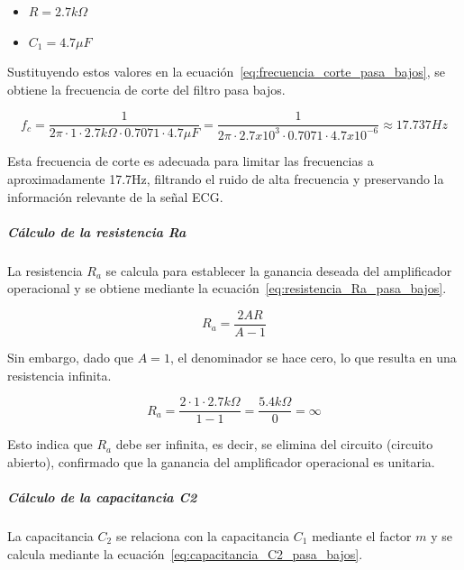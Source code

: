                     \begin{itemize}
                        \item $R = 2.7 k\Omega$
                        \item $C_1 = 4.7 \mu F$
                    \end{itemize}

                    Sustituyendo estos valores en la ecuación~\ref{eq:frecuencia_corte_pasa_bajos}, se obtiene la frecuencia de corte del filtro pasa bajos.

                    \begin{equation}
                        \label{eq:frecuencia_corte_pasa_bajos_valor}
                        f_c = \frac{1}{2\pi \cdot 1 \cdot 2.7 k\Omega \cdot 0.7071\cdot 4.7 \mu F} = \frac{1}{2\pi \cdot 2.7 x10^3 \cdot 0.7071\cdot 4.7 x10^{-6}} \approx 17.737 Hz
                    \end{equation}

                    Esta frecuencia de corte es adecuada para limitar las frecuencias a aproximadamente 17.7Hz, filtrando el ruido de alta frecuencia y preservando la información relevante de la señal ECG.

                \subparagraph{Cálculo de la resistencia Ra}
                    La resistencia $R_a$ se calcula para establecer la ganancia deseada del amplificador operacional y se obtiene mediante la ecuación~\ref{eq:resistencia_Ra_pasa_bajos}.

                    \begin{equation}
                        \label{eq:resistencia_Ra_pasa_bajos}
                        R_a = \frac{2AR}{A-1}
                    \end{equation}

                    Sin embargo, dado que $A = 1$, el denominador se hace cero, lo que resulta en una resistencia infinita. 

                    \begin{equation}
                        \label{eq:resistencia_Ra_pasa_bajos_valor}
                        R_a = \frac{2 \cdot 1 \cdot 2.7 k\Omega}{1 - 1} = \frac{5.4 k\Omega}{0} = \infty
                    \end{equation}

                    Esto indica que $R_a$ debe ser infinita, es decir, se elimina del circuito (circuito abierto), confirmado que la ganancia del amplificador operacional es unitaria.

                \subparagraph{Cálculo de la capacitancia C2}
                    La capacitancia $C_2$ se relaciona con la capacitancia $C_1$ mediante el factor $m$ y se calcula mediante la ecuación~\ref{eq:capacitancia_C2_pasa_bajos}.

